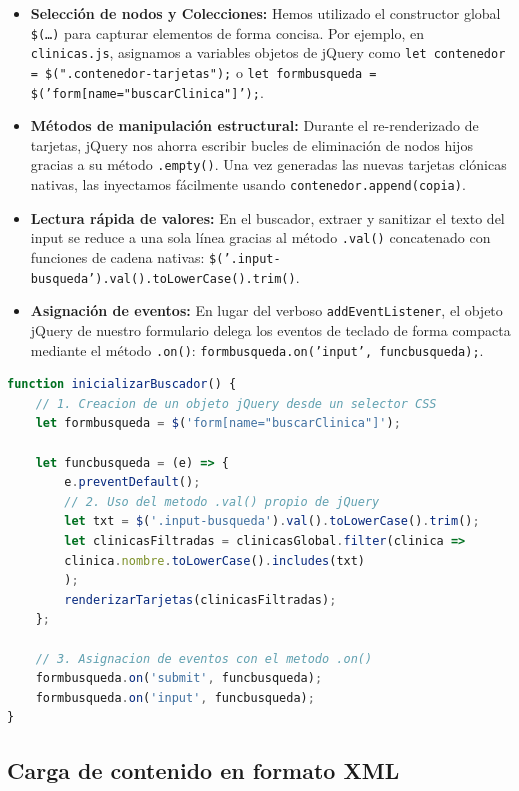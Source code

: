 \documentclass[11pt]{article}
\begin{document}
\begin{itemize}
\item \textbf{Selección de nodos y Colecciones:} Hemos utilizado el constructor global \texttt{\$(\ldots)} para capturar elementos de forma concisa. Por ejemplo, en \texttt{clinicas.js}, asignamos a variables objetos de jQuery como \texttt{let contenedor = \$(".contenedor-tarjetas");} o \texttt{let formbusqueda = \$('form[name="buscarClinica"]');}.
\item \textbf{Métodos de manipulación estructural:} Durante el re-renderizado de tarjetas, jQuery nos ahorra escribir bucles de eliminación de nodos hijos gracias a su método \texttt{.empty()}. Una vez generadas las nuevas tarjetas clónicas nativas, las inyectamos fácilmente usando \texttt{contenedor.append(copia)}.
\item \textbf{Lectura rápida de valores:} En el buscador, extraer y sanitizar el texto del input se reduce a una sola línea gracias al método \texttt{.val()} concatenado con funciones de cadena nativas: \texttt{\$('.input-busqueda').val().toLowerCase().trim()}.
\item \textbf{Asignación de eventos:} En lugar del verboso \texttt{addEventListener}, el objeto jQuery de nuestro formulario delega los eventos de teclado de forma compacta mediante el método \texttt{.on()}: \texttt{formbusqueda.on('input', funcbusqueda);}.
\end{itemize}

\begin{lstlisting}[language=JavaScript, caption=Manipulación del DOM y eventos mediante jQuery en clinicas.js]
function inicializarBuscador() {
	// 1. Creacion de un objeto jQuery desde un selector CSS
	let formbusqueda = $('form[name="buscarClinica"]');
	
	let funcbusqueda = (e) => {
		e.preventDefault();
		// 2. Uso del metodo .val() propio de jQuery
		let txt = $('.input-busqueda').val().toLowerCase().trim();
		let clinicasFiltradas = clinicasGlobal.filter(clinica =>
		clinica.nombre.toLowerCase().includes(txt)
		);
		renderizarTarjetas(clinicasFiltradas);
	};
	
	// 3. Asignacion de eventos con el metodo .on()
	formbusqueda.on('submit', funcbusqueda);
	formbusqueda.on('input', funcbusqueda);
}
\end{lstlisting}

\clearpage

\subsection{Carga de contenido en formato XML}
\end{document}
